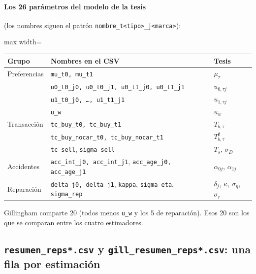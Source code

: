 \documentclass[11pt]{article}
\newcommand{\col}[1]{\texttt{#1}}
\newcommand{\archivo}[1]{\textbf{\texttt{#1}}}
\begin{document}
\paragraph{Los 26 parámetros del modelo de la tesis} (los nombres siguen el patrón
\col{nombre\_t<tipo>\_j<marca>}):
\begin{center}\small
\begin{adjustbox}{max width=\textwidth}\begin{tabular}{lll}
\toprule
Grupo & Nombres en el CSV & Tesis\\
\midrule
Preferencias & \col{mu\_t0, mu\_t1} & $\mu_\tau$\\
 & \col{u0\_t0\_j0, u0\_t0\_j1, u0\_t1\_j0, u0\_t1\_j1} & $u_{0,\tau j}$\\
 & \col{u1\_t0\_j0, \dots, u1\_t1\_j1} & $u_{1,\tau j}$\\
 & \col{u\_w} & $u_w$\\
Transacción & \col{tc\_buy\_t0, tc\_buy\_t1} & $T_{b,\tau}$\\
 & \col{tc\_buy\_nocar\_t0, tc\_buy\_nocar\_t1} & $T^\emptyset_{b,\tau}$\\
 & \col{tc\_sell}, \col{sigma\_sell} & $T_s$, $\sigma_D$\\
Accidentes & \col{acc\_int\_j0, acc\_int\_j1}, \col{acc\_age\_j0, acc\_age\_j1} & $\alpha_{0j}$, $\alpha_{1j}$\\
Reparación & \col{delta\_j0, delta\_j1}, \col{kappa}, \col{sigma\_eta}, \col{sigma\_rep} & $\delta_j$, $\kappa$, $\sigma_\eta$, $\sigma_r$\\
\bottomrule
\end{tabular}\end{adjustbox}
\end{center}
Gillingham comparte 20 (todos menos \col{u\_w} y los 5 de reparación). Esos 20 son
los que se comparan entre los cuatro estimadores.

\subsection{\archivo{resumen\_reps*.csv} y \archivo{gill\_resumen\_reps*.csv}: una fila por estimación}
\end{document}
